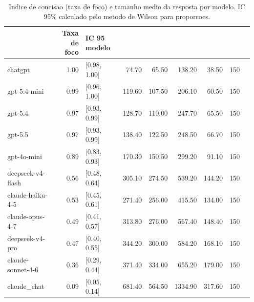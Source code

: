 \begin{table}[ht]
\caption{Indice de concisao (taxa de foco) e tamanho medio da resposta por modelo. IC 95\% calculado pelo metodo de Wilson para proporcoes.}
\label{tab:tokens_foco}
\begin{tabular}{lrlrrrrr}
\toprule
 & Taxa de foco & IC 95%
modelo &  &  &  &  &  &  &  \\
\midrule
chatgpt & 1.00 & [0.98, 1.00] & 74.70 & 65.50 & 138.20 & 38.50 & 150 \\
gpt-5.4-mini & 0.99 & [0.96, 1.00] & 119.60 & 107.50 & 206.10 & 60.50 & 150 \\
gpt-5.4 & 0.97 & [0.93, 0.99] & 128.70 & 110.00 & 247.70 & 65.50 & 150 \\
gpt-5.5 & 0.97 & [0.93, 0.99] & 138.40 & 122.50 & 248.50 & 66.70 & 150 \\
gpt-4o-mini & 0.89 & [0.83, 0.93] & 170.30 & 150.50 & 299.20 & 91.10 & 150 \\
deepseek-v4-flash & 0.56 & [0.48, 0.64] & 305.10 & 274.50 & 539.20 & 144.20 & 150 \\
claude-haiku-4-5 & 0.53 & [0.45, 0.61] & 271.40 & 256.00 & 415.50 & 134.00 & 150 \\
claude-opus-4-7 & 0.49 & [0.41, 0.57] & 313.80 & 276.00 & 567.40 & 148.40 & 150 \\
deepseek-v4-pro & 0.47 & [0.40, 0.55] & 344.20 & 300.00 & 584.20 & 168.10 & 150 \\
claude-sonnet-4-6 & 0.36 & [0.29, 0.44] & 371.40 & 334.00 & 655.20 & 179.00 & 150 \\
claude_chat & 0.09 & [0.05, 0.14] & 681.40 & 564.50 & 1334.90 & 317.60 & 150 \\
\bottomrule
\end{tabular}
\end{table}
